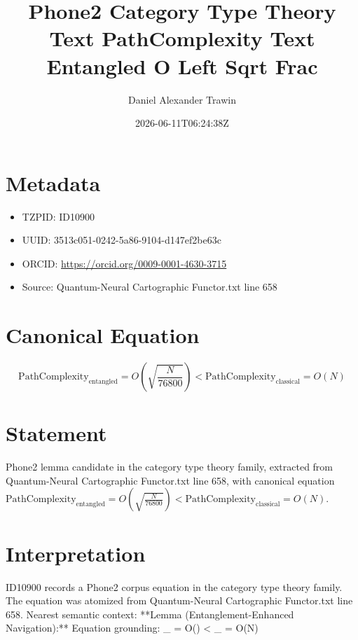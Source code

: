 \documentclass[11pt]{article}
\title{Phone2 Category Type Theory Text PathComplexity Text Entangled O Left Sqrt Frac}
\author{Daniel Alexander Trawin}
\date{2026-06-11T06:24:38Z}
\begin{document}
\maketitle
\section*{Metadata}
\begin{itemize}
\item TZPID: ID10900
\item UUID: 3513c051-0242-5a86-9104-d147ef2be63c
\item ORCID: \url{https://orcid.org/0009-0001-4630-3715}
\item Source: Quantum-Neural Cartographic Functor.txt line 658
\end{itemize}
\section*{Canonical Equation}
\[
\text{PathComplexity}_{\text{entangled}} = O\left(\sqrt{\frac{N}{76800}}\right) < \text{PathComplexity}_{\text{classical}} = O(N)
\]
\section*{Statement}
Phone2 lemma candidate in the category type theory family, extracted from Quantum-Neural Cartographic Functor.txt line 658, with canonical equation $\text{PathComplexity}_{\text{entangled}} = O\left(\sqrt{\frac{N}{76800}}\right) < \text{PathComplexity}_{\text{classical}} = O(N)$.
\section*{Interpretation}
ID10900 records a Phone2 corpus equation in the category type theory family. The equation was atomized from Quantum-Neural Cartographic Functor.txt line 658. Nearest semantic context: **Lemma (Entanglement-Enhanced Navigation):** Equation grounding: _{} = O\left(\right) < _{} = O(N)
\end{document}
